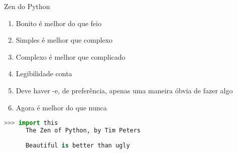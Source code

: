 \begin{frame}[t, fragile]{Zen do Python}
  \begin{enumerate}
    \item Bonito é melhor do que feio
    \item Simples é melhor que complexo
    \item Complexo é melhor que complicado
    \item Legibilidade conta
    \item Deve haver -e, de preferência, apenas uma maneira óbvia de fazer algo
    \item Agora é melhor do que nunca
  \end{enumerate}
  \begin{lstlisting}[language=python]
      >>> import this
      The Zen of Python, by Tim Peters
      
      Beautiful is better than ugly
  \end{lstlisting}
\end{frame}
%
